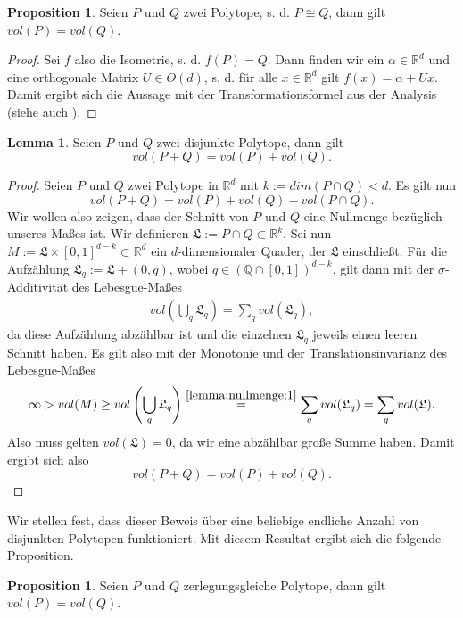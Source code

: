 \documentclass[11pt,titlepage]{article}
\newcommand{\setQ}{\mathbb{Q}}
\newcommand{\setR}{\mathbb{R}}
\theoremstyle{definition}
\newtheorem{proposition}[theorem]{Proposition}
\newtheorem{lemma}[theorem]{Lemma}
\theoremstyle{remark}
\begin{document}
	\begin{proposition} \label{prop:cong,vol}
		Seien $P$ und $Q$ zwei Polytope, s. d. $P\cong Q$, dann gilt $vol(P)=vol(Q)$.
	\end{proposition}
	
	\begin{proof}
		Sei $f$ also die Isometrie, s. d. $f(P)=Q$. Dann finden wir ein 
		$\alpha\in\setR^d$ und eine orthogonale Matrix $U\in O(d)$, s. d. für 
		alle $x\in\setR^d$ gilt $f(x)=\alpha+Ux$. Damit ergibt sich die Aussage 
		mit der Transformationsformel 
		aus der Analysis (siehe auch \cite[Satz 4.7]{SkriptAna3}).
	\end{proof}
	
	\begin{lemma}\label{lemma:nullmenge}
		Seien $P$ und $Q$ zwei disjunkte Polytope, dann gilt
		\[ vol(P+Q)=vol(P)+vol(Q).\]
	\end{lemma}

	\begin{proof}
		Seien $P$ und $Q$ zwei Polytope in $\setR^d$ 
		mit $k:=dim(P\cap Q)<d$. Es gilt nun 
		\[vol(P+Q)=vol(P)+vol(Q)-vol(P\cap Q).\]
		Wir wollen also zeigen, dass der Schnitt von $P$ und $Q$ eine Nullmenge bezüglich unseres Maßes ist. 
		Wir definieren $\mathfrak{L}:=P\cap Q \subset \setR^k$. Sei nun  $M:=\mathfrak{L}\times[0,1]^{d-k}\subset\setR^d$ ein $d$-dimensionaler Quader, der 
		$\mathfrak{L}$ einschließt. Für die Aufzählung $\mathfrak{L}_q:=\mathfrak{L}+(0,q)$, wobei $q\in(\setQ\cap[0,1])^{d-k}$, gilt dann mit der $\sigma$-Additivität des Lebesgue-Maßes
		\begin{align}
			vol \left(\bigcup_q\mathfrak{L}_q\right)=\sum_q vol(\mathfrak{L}_q), \label{lemma:nullmenge;1}
		\end{align}
		da diese Aufzählung abzählbar ist und die einzelnen $\mathfrak{L}_q$ jeweils einen leeren Schnitt haben. Es gilt also mit der Monotonie und der Translationsinvarianz des Lebesgue-Maßes
		\[\infty>vol(M)\geq vol\left(\bigcup_q \mathfrak{L}_q\right)\overset{\ref{lemma:nullmenge;1}}{=}\sum_q vol(\mathfrak{L}_q)=\sum_q vol(\mathfrak{L}).\]
		Also muss gelten $vol(\mathfrak{L})=0$, da wir eine abzählbar große Summe haben. 
		Damit ergibt sich also
		\[vol(P+Q)=vol(P)+vol(Q).\]
	\end{proof}

	Wir stellen fest, dass dieser Beweis über eine beliebige endliche Anzahl von disjunkten 
	Polytopen funktioniert. Mit diesem Resultat ergibt sich die folgende Proposition.
	
	\begin{proposition} \label{prop:zerl,vol}
		Seien $P$ und $Q$ zerlegungsgleiche Polytope, dann gilt $vol(P)=vol(Q)$.
	\end{proposition}
	
\end{document}
